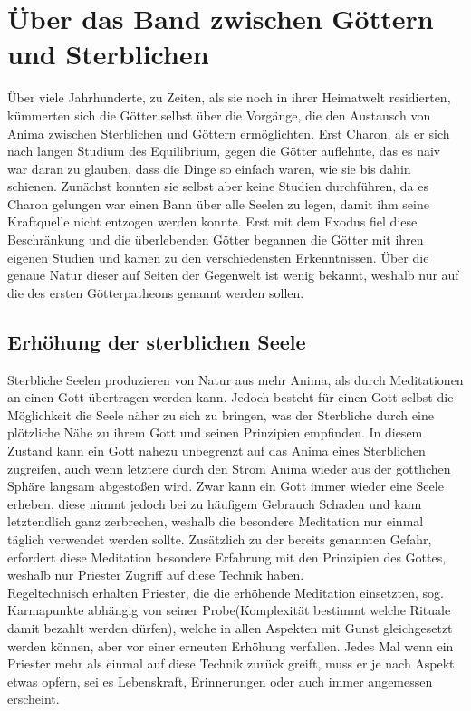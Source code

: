 \documentclass[a4paper,12pt,oneside]{book}
\begin{document}
\section{Über das Band zwischen Göttern und Sterblichen}
Über viele Jahrhunderte, zu Zeiten, als sie noch in ihrer Heimatwelt residierten, kümmerten sich die Götter selbst über die Vorgänge, die den Austausch von Anima zwischen Sterblichen und Göttern ermöglichten. Erst Charon, als er sich nach langen Studium des Equilibrium, gegen die Götter auflehnte, das es naiv war daran zu glauben, dass die Dinge so einfach waren, wie sie bis dahin schienen. Zunächst konnten sie selbst aber keine Studien durchführen, da es Charon gelungen war einen Bann über alle Seelen zu legen, damit ihm seine Kraftquelle nicht entzogen werden konnte. Erst mit dem Exodus fiel diese Beschränkung und die überlebenden Götter begannen die Götter mit ihren eigenen Studien und kamen zu den verschiedensten Erkenntnissen. Über die genaue Natur dieser auf Seiten der Gegenwelt ist wenig bekannt, weshalb nur auf die des ersten Götterpatheons genannt werden sollen.
\subsection{Erhöhung der sterblichen Seele}
Sterbliche Seelen produzieren von Natur aus mehr Anima, als durch Meditationen an einen Gott übertragen werden kann. Jedoch besteht für einen Gott selbst die Möglichkeit die Seele näher zu sich zu bringen, was der Sterbliche durch eine plötzliche Nähe zu ihrem Gott und seinen Prinzipien empfinden. In diesem Zustand kann ein Gott nahezu unbegrenzt auf das Anima eines Sterblichen zugreifen, auch wenn letztere durch den Strom Anima wieder aus der göttlichen Sphäre langsam abgestoßen wird. Zwar kann ein Gott immer wieder eine Seele erheben, diese nimmt jedoch bei zu häufigem Gebrauch Schaden und kann letztendlich ganz zerbrechen, weshalb die besondere Meditation nur einmal täglich verwendet werden sollte. Zusätzlich zu der bereits genannten Gefahr, erfordert diese Meditation besondere Erfahrung mit den Prinzipien des Gottes, weshalb nur Priester Zugriff auf diese Technik haben.
\\Regeltechnisch erhalten Priester, die die erhöhende Meditation einsetzten, sog. Karmapunkte abhängig von seiner Probe(Komplexität bestimmt welche Rituale damit bezahlt werden dürfen), welche in allen Aspekten mit Gunst gleichgesetzt werden können, aber vor einer erneuten Erhöhung verfallen. Jedes Mal wenn ein Priester mehr als einmal auf diese Technik zurück greift, muss er je nach Aspekt etwas opfern, sei es Lebenskraft, Erinnerungen oder auch immer angemessen erscheint.
\end{document}
